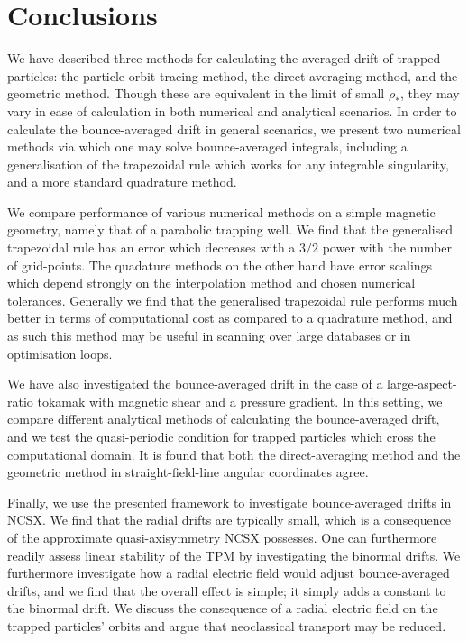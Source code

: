 \section{Conclusions}
We have described three methods for calculating the averaged drift of trapped particles: the particle-orbit-tracing method, the direct-averaging method, and the geometric method. Though these are equivalent in the limit of small $\rho_*$, they may vary in ease of calculation in both numerical and analytical scenarios. In order to calculate the bounce-averaged drift in general scenarios, we present two numerical methods via which one may solve bounce-averaged integrals, including a generalisation of the trapezoidal rule which works for any integrable singularity, and a more standard quadrature method. \par
We compare performance of various numerical methods on a simple magnetic geometry, namely that of a parabolic trapping well. We find that the generalised trapezoidal rule has an error which decreases with a $3/2$ power with the number of grid-points. The quadature methods on the other hand have error scalings which depend strongly on the interpolation method and chosen numerical tolerances. Generally we find that the generalised trapezoidal rule performs much better in terms of computational cost as compared to a quadrature method, and as such this method may be useful in scanning over large databases or in optimisation loops. \par 
We have also investigated the bounce-averaged drift in the case of a large-aspect-ratio tokamak with magnetic shear and a pressure gradient. In this setting, we compare different analytical methods of calculating the bounce-averaged drift, and we test the quasi-periodic condition for trapped particles which cross the computational domain. It is found that both the direct-averaging method and the geometric method in straight-field-line angular coordinates agree. \par 
Finally, we use the presented framework to investigate bounce-averaged drifts in NCSX. We find that the radial drifts are typically small, which is a consequence of the approximate quasi-axisymmetry NCSX possesses. One can furthermore readily assess linear stability of the TPM by investigating the binormal drifts. We furthermore investigate how a radial electric field would adjust bounce-averaged drifts, and we find that the overall effect is simple; it simply adds a constant to the binormal drift. We discuss the consequence of a radial electric field on the trapped particles' orbits and argue that neoclassical transport may be reduced. \par 
